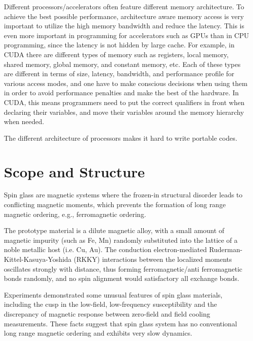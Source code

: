 Different processors/accelerators often feature different memory architecture.
To achieve the best possible performance, architecture aware memory access is 
very important to utilize the high memory bandwidth and reduce the latency.
This is even more important in programming for accelerators such as GPUs than in
CPU programming, since the latency is not hidden by large cache.
For example, in CUDA %
there are different types of memory such as registers, local memory, shared 
memory, global memory, and constant memory, etc. Each of these types are 
different in terms of size, latency, bandwidth, and performance profile for 
various access modes, and one have to make conscious decisions when using them
in order to avoid performance penalties and make the best of the hardware. 
In CUDA, this means programmers need to put the correct qualifiers in front when 
declaring their variables, and move their variables around the memory hierarchy 
when needed.
 

The different architecture of processors makes it hard to write portable codes.


\section{Scope and Structure}


\iffalse
Spin glass \cite{Binder-Young1986} are magnetic systems where the frozen-in 
structural disorder leads to conflicting magnetic moments, which prevents the
formation of long range magnetic ordering, e.g., ferromagnetic ordering.

The prototype material is a dilute magnetic alloy, with a small amount of 
magnetic impurity (such as Fe, Mn) randomly substituted into the lattice of a 
noble metallic host (i.e. Cu, Au). The conduction electron-mediated 
Ruderman-Kittel-Kasuya-Yoshida (RKKY) interactions between the localized moments
 oscillates strongly with distance, thus forming ferromagnetic/anti 
ferromagnetic bonds randomly, and no spin alignment would satisfactory all 
exchange bonds. 

Experiments demonstrated some unusual features of spin glass materials, 
including the cusp in the low-field, low-frequency susceptibility and the 
discrepancy of magnetic response between zero-field and field cooling 
measurements. These facts suggest that spin glass system has no conventional 
long range magnetic ordering and exhibits very slow dynamics. 

